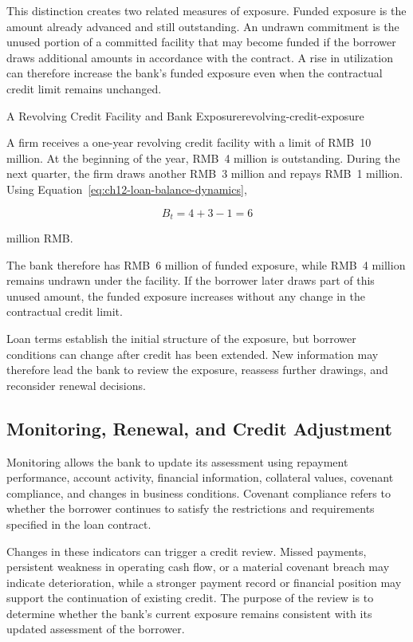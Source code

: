 This distinction creates two related measures of exposure. Funded exposure is the amount already advanced and still outstanding. An undrawn commitment is the unused portion of a committed facility that may become funded if the borrower draws additional amounts in accordance with the contract. A rise in utilization can therefore increase the bank's funded exposure even when the contractual credit limit remains unchanged.

\begin{example}{A Revolving Credit Facility and Bank Exposure}{revolving-credit-exposure}

A firm receives a one-year revolving credit facility with a limit of RMB~10 million. At the beginning of the year, RMB~4 million is outstanding. During the next quarter, the firm draws another RMB~3 million and repays RMB~1 million. Using Equation~\ref{eq:ch12-loan-balance-dynamics},

\[
B_t=4+3-1=6
\]

million RMB.

The bank therefore has RMB~6 million of funded exposure, while RMB~4 million remains undrawn under the facility. If the borrower later draws part of this unused amount, the funded exposure increases without any change in the contractual credit limit.

\end{example}

Loan terms establish the initial structure of the exposure, but borrower conditions can change after credit has been extended. New information may therefore lead the bank to review the exposure, reassess further drawings, and reconsider renewal decisions.

\subsection{Monitoring, Renewal, and Credit Adjustment}

Monitoring allows the bank to update its assessment using repayment performance, account activity, financial information, collateral values, covenant compliance, and changes in business conditions. Covenant compliance refers to whether the borrower continues to satisfy the restrictions and requirements specified in the loan contract.

Changes in these indicators can trigger a credit review. Missed payments, persistent weakness in operating cash flow, or a material covenant breach may indicate deterioration, while a stronger payment record or financial position may support the continuation of existing credit. The purpose of the review is to determine whether the bank's current exposure remains consistent with its updated assessment of the borrower.

